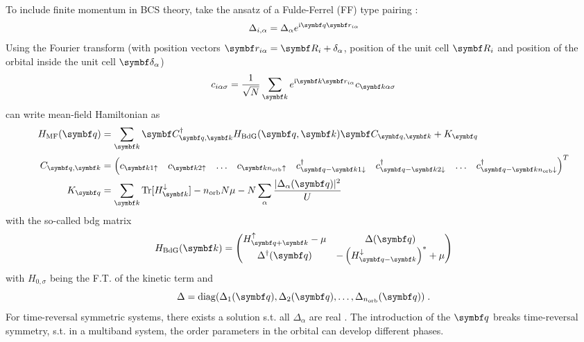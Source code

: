 \documentclass[../notes.tex]{subfiles}
\begin{document}
To include finite momentum in BCS theory, take the ansatz of a Fulde-Ferrel (FF) type pairing \cite{kinnunenFuldeFerrellLarkin2018}:
\begin{equation}
	\Delta_{i, \alpha} = \Delta_{\alpha} e^{\iu \vb{q} \vb{r}_{i \alpha}}
\end{equation}
Using the Fourier transform (with position vectors \(\vb{r}_{i \alpha} = \vb{R}_i + \delta_{\alpha}\), position of the unit cell \(\vb{R}_i\) and position of the orbital inside the unit cell \(\vb{\delta}_{\alpha}\))
\begin{equation}
	c_{i \alpha \sigma} = \frac{1}{\sqrt{N}} \sum_{\vb{k}} e^{\iu \vb{k} \vb{r}_{i \alpha}} c_{\vb{k} \alpha \sigma}
\end{equation}
can write mean-field Hamiltonian as
\begin{align}
	H_{\mathrm{MF}} (\vb{q}) &= \sum_{\vb{k}} \vb{C}_{\vb{q}, \vb{k}}^{\dagger} H_{\mathrm{BdG}} (\vb{q}, \vb{k}) \vb{C}_{\vb{q}, \vb{k}} + K_{\vb{q}} \\
	C_{\vb{q}, \vb{k}} &= 
		\begin{pmatrix}
			c_{\vb{k} 1 \uparrow} & 
			c_{\vb{k} 2 \uparrow} &
			\ldots &
			c_{\vb{k} n_{\mathrm{orb}} \uparrow} &
			c_{\vb{q} -\vb{k} 1 \downarrow}^{\dagger} &
			c_{\vb{q} -\vb{k} 2 \downarrow}^{\dagger} &
			\ldots &
			c_{\vb{q} -\vb{k} n_{\mathrm{orb}} \downarrow}^{\dagger}
		\end{pmatrix}^{T} \\
		K_{\vb{q}} &= \sum_{\vb{k}} \Tr [H_{\vb{k}}^{\downarrow}] - n_{\mathrm{orb}} N \mu - N \sum_{\alpha} \frac{\vert \Delta_{\alpha} (\vb{q}) \vert^2}{U}
\end{align}
with the so-called \acrfull{bdg} matrix
\begin{equation}
	H_{\mathrm{BdG}} (\vb{k}) =
	\begin{pmatrix}
		H^{\uparrow}_{\vb{q} + \vb{k}} - \mu & \Delta (\vb{q}) \\
		\Delta^{\dagger} (\vb{q}) & - \left(H^{\downarrow}_{\vb{q} - \vb{k}}\right)^* + \mu
	\end{pmatrix}
\end{equation}
with \(H_{0, \sigma}\) being the F.T. of the kinetic term  and
\begin{equation}
	\Delta = \diag(\Delta_1 (\vb{q}), \Delta_2 (\vb{q}), \ldots, \Delta_{n_{\mathrm{orb}}} (\vb{q}))\;.
\end{equation}
For time-reversal symmetric systems, there exists a solution s.t. all \(\Delta_{\alpha}\) are real \cite{peottaSuperfluidityTopologicallyNontrivial2015}.
The introduction of the \(\vb{q}\) breaks time-reversal symmetry, s.t. in a multiband system, the order parameters in the orbital can develop different phases.
\end{document}
